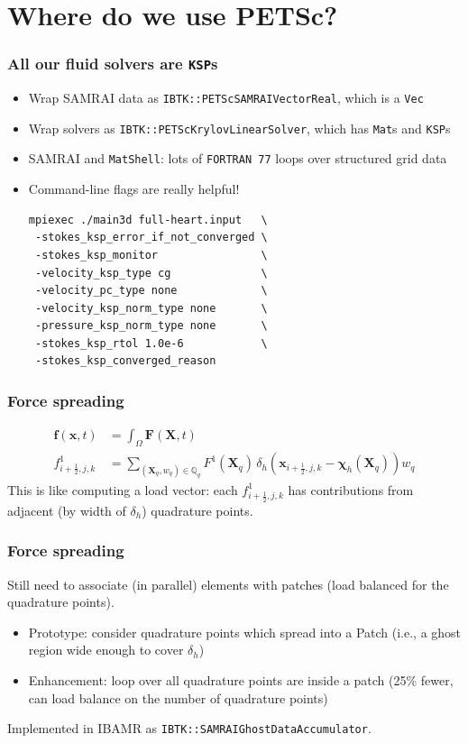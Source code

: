 \documentclass[8pt]{beamer}
\newcommand{\half}{{\ensuremath{\frac{1}{2}}}}
\newcommand{\Chib}{\boldsymbol{\chi}}
\newcommand{\xface}{{i + \half, j, k}}
\newcommand{\xb}{\boldsymbol{x}}
\newcommand{\Xb}{\boldsymbol{X}}
\begin{document}
\section{Where do we use PETSc?}
\begin{frame}[fragile]
    \frametitle{All our fluid solvers are \texttt{KSP}s}
    \vfill
    \begin{itemize}
      \item[$\blacksquare$] Wrap SAMRAI data as
        \texttt{IBTK::PETScSAMRAIVectorReal}, which is a \texttt{Vec}
        \vfill
      \item[$\blacksquare$] Wrap solvers as
        \texttt{IBTK::PETScKrylovLinearSolver}, which has \texttt{Mat}s
        and \texttt{KSP}s
        \vfill
      \item[$\blacksquare$] SAMRAI and \texttt{MatShell}: lots of
        \texttt{FORTRAN 77} loops over structured grid data
        \vfill
      \item[$\blacksquare$] Command-line flags are really helpful!
        \begin{verbatim}
mpiexec ./main3d full-heart.input   \
 -stokes_ksp_error_if_not_converged \
 -stokes_ksp_monitor                \
 -velocity_ksp_type cg              \
 -velocity_pc_type none             \
 -velocity_ksp_norm_type none       \
 -pressure_ksp_norm_type none       \
 -stokes_ksp_rtol 1.0e-6            \
 -stokes_ksp_converged_reason
        \end{verbatim}
    \end{itemize}
    \vfill
\end{frame}

\begin{frame}
    \frametitle{Force spreading}
    \vfill
    \begin{align*}
      \mathbf{f}(\xb, t)
        &= \int_\Omega \mathbf{F}(\Xb, t) \\
        f^1_{\xface}
        &= \sum_{(\Xb_q, w_q) \in \mathbb{Q}_q} F^1(\Xb_{q})
          \, \delta_h(\xb_{\xface} - \Chib_h(\Xb_{q}))w_{q}
    \end{align*}
    \vfill
    This is like computing a load vector: each $f^1_{\xface}$ has
    contributions from adjacent (by width of $\delta_h$) quadrature points.
    \vfill
\end{frame}

\begin{frame}
    \frametitle{Force spreading}
    Still need to associate (in parallel) elements with patches (load balanced for the quadrature points).
        \vfill
    \begin{itemize}
      \item[$\blacksquare$] Prototype: consider quadrature points which spread into a Patch (i.e., a ghost region wide enough to cover $\delta_h$)
        \vfill
      \item[$\blacksquare$] Enhancement: loop over all quadrature points are inside a patch (25\% fewer, can load balance on the number of quadrature points)
    \end{itemize}

    \vfill
    Implemented in IBAMR as \texttt{IBTK::SAMRAIGhostDataAccumulator}.
\end{frame}
\end{document}

